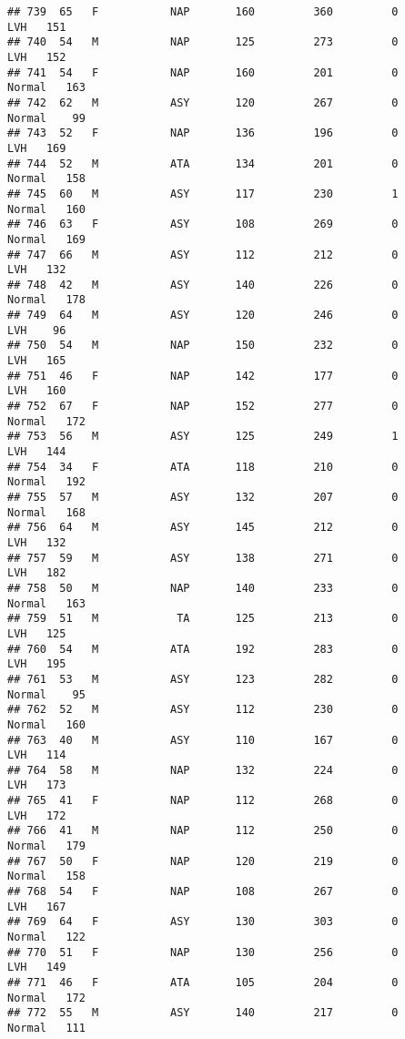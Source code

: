 \documentclass[
]{article}
\begin{document}
\begin{verbatim}
## 739  65   F           NAP       160         360         0        LVH   151
## 740  54   M           NAP       125         273         0        LVH   152
## 741  54   F           NAP       160         201         0     Normal   163
## 742  62   M           ASY       120         267         0     Normal    99
## 743  52   F           NAP       136         196         0        LVH   169
## 744  52   M           ATA       134         201         0     Normal   158
## 745  60   M           ASY       117         230         1     Normal   160
## 746  63   F           ASY       108         269         0     Normal   169
## 747  66   M           ASY       112         212         0        LVH   132
## 748  42   M           ASY       140         226         0     Normal   178
## 749  64   M           ASY       120         246         0        LVH    96
## 750  54   M           NAP       150         232         0        LVH   165
## 751  46   F           NAP       142         177         0        LVH   160
## 752  67   F           NAP       152         277         0     Normal   172
## 753  56   M           ASY       125         249         1        LVH   144
## 754  34   F           ATA       118         210         0     Normal   192
## 755  57   M           ASY       132         207         0     Normal   168
## 756  64   M           ASY       145         212         0        LVH   132
## 757  59   M           ASY       138         271         0        LVH   182
## 758  50   M           NAP       140         233         0     Normal   163
## 759  51   M            TA       125         213         0        LVH   125
## 760  54   M           ATA       192         283         0        LVH   195
## 761  53   M           ASY       123         282         0     Normal    95
## 762  52   M           ASY       112         230         0     Normal   160
## 763  40   M           ASY       110         167         0        LVH   114
## 764  58   M           NAP       132         224         0        LVH   173
## 765  41   F           NAP       112         268         0        LVH   172
## 766  41   M           NAP       112         250         0     Normal   179
## 767  50   F           NAP       120         219         0     Normal   158
## 768  54   F           NAP       108         267         0        LVH   167
## 769  64   F           ASY       130         303         0     Normal   122
## 770  51   F           NAP       130         256         0        LVH   149
## 771  46   F           ATA       105         204         0     Normal   172
## 772  55   M           ASY       140         217         0     Normal   111

\end{verbatim}
\end{document}
